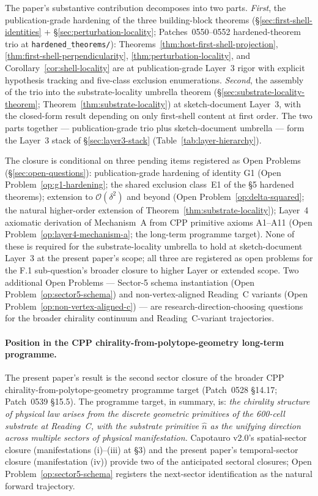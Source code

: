 \documentclass[11pt,letterpaper]{article}
\newcommand{\bigO}[1]{\mathcal{O}(#1)}
\begin{document}
The paper's substantive contribution decomposes into two parts. \emph{First}, the publication-grade hardening of the three building-block theorems (\S\ref{sec:first-shell-identities} + \S\ref{sec:perturbation-locality}; Patches~0550--0552 hardened-theorem trio at \texttt{hardened\_theorems/}): Theorems~\ref{thm:host-first-shell-projection}, \ref{thm:first-shell-perpendicularity}, \ref{thm:perturbation-locality}, and Corollary~\ref{cor:shell-locality} are at publication-grade Layer~3 rigor with explicit hypothesis tracking and five-class exclusion enumerations. \emph{Second}, the assembly of the trio into the substrate-locality umbrella theorem (\S\ref{sec:substrate-locality-theorem}; Theorem~\ref{thm:substrate-locality}) at sketch-document Layer~3, with the closed-form result depending on only first-shell content at first order. The two parts together --- publication-grade trio plus sketch-document umbrella --- form the Layer~3 stack of \S\ref{sec:layer3-stack} (Table~\ref{tab:layer-hierarchy}).

The closure is conditional on three pending items registered as Open Problems (\S\ref{sec:open-questions}): publication-grade hardening of identity G1 (Open Problem~\ref{op:g1-hardening}; the shared exclusion class~E1 of the §5 hardened theorems); extension to $\bigO{\delta^2}$ and beyond (Open Problem~\ref{op:delta-squared}; the natural higher-order extension of Theorem~\ref{thm:substrate-locality}); Layer~4 axiomatic derivation of Mechanism~A from CPP primitive axioms A1--A11 (Open Problem~\ref{op:layer4-mechanism-a}; the long-term programme target). None of these is required for the substrate-locality umbrella to hold at sketch-document Layer~3 at the present paper's scope; all three are registered as open problems for the F.1 sub-question's broader closure to higher Layer or extended scope. Two additional Open Problems --- Sector-5 schema instantiation (Open Problem~\ref{op:sector5-schema}) and non-vertex-aligned Reading~C variants (Open Problem~\ref{op:non-vertex-aligned-c}) --- are research-direction-choosing questions for the broader chirality continuum and Reading~C-variant trajectories.

\paragraph{Position in the CPP chirality-from-polytope-geometry long-term programme.}
The present paper's result is the second sector closure of the broader CPP chirality-from-polytope-geometry programme target (Patch~0528 \S14.17; Patch~0539 \S15.5). The programme target, in summary, is: \emph{the chirality structure of physical law arises from the discrete geometric primitives of the 600-cell substrate at Reading~C, with the substrate primitive $\hat{n}$ as the unifying direction across multiple sectors of physical manifestation.} Capotauro v2.0's spatial-sector closure (manifestations (i)--(iii) at \S3) and the present paper's temporal-sector closure (manifestation (iv)) provide two of the anticipated sectoral closures; Open Problem~\ref{op:sector5-schema} registers the next-sector identification as the natural forward trajectory.
\end{document}
